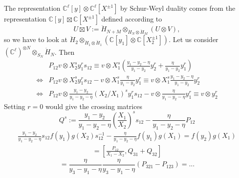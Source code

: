 \documentclass[11pt]{report}
\theoremstyle{definition}
\theoremstyle{remark}
\theoremstyle{remark}
\newcommand{\C}{\mathbb{C}}
\begin{document}
The representation $\C^\ell[y] \otimes \C^\ell[X^{\pm 1}]$ by Schur-Weyl duality comes from the representation $\C[y] \boxtimes \C[X^{\pm 1}]$ defined according to
\begin{equation*}
U \boxtimes V := \ddot{H}_{N+M} \otimes_{\ddot{H}_N \otimes \ddot{H}_M} (U \otimes V),
\end{equation*}
so we have to look at $\ddot{H}_2 \otimes_{\ddot{H}_1 \otimes \ddot{H}_1} (\C[y_1] \otimes \C[X_2^{\pm 1}])$. Let us consider $(\C^\ell)^{\otimes N} \otimes_{S_N} \ddot{H}_N$. Then
\begin{align*}
&P_{12} v \otimes X_2^s y_1^r s_{12}
\equiv v \otimes X_1^s \left( \frac{y_1-y_2-\eta}{y_1-y_2} y_2^r + \frac{\eta}{y_1-y_2} y_1^r \right) \\
\Leftrightarrow &P_{12} v \otimes X_2^s y_1^r s_{12} - v \otimes X_1^s \frac{\eta}{y_1-y_2} y_1^r \equiv v \otimes X_1^s \frac{y_1-y_2-\eta}{y_1-y_2} y_2^r \\
\Leftrightarrow &P_{12} v \otimes \frac{y_1-y_2}{y_1-y_2-\eta} (X_2/X_1)^s y_1^r s_{12} - v \otimes \frac{\eta}{y_1-y_2-\eta} y_1^r \equiv v \otimes y_2^r
\end{align*}
Setting $r=0$ would give the crossing matrices
\begin{equation*}
Q^s := \frac{y_1-y_2}{y_1-y_2-\eta} \left( \frac{X_1}{X_2} \right)^s s_{12} - \frac{\eta}{y_1-y_2-\eta} P_{12}
\end{equation*}
\begin{align*}
\frac{y_1-y_2}{y_1-y_2-\eta} s_{12} f(y_1) g(X_2) s_{12}^{-1} - \frac{\eta}{y_1-y_2-\eta} f(y_1) g(X_1) = f(y_2) g(X_1)
\end{align*}
\begin{align*}
[Q_{31},Q_{32}] = [\frac{P_{12}}{X_1-X_2},Q_{31}+Q_{32}]
\end{align*}
\begin{equation*}
[Q_{31},Q_{32}] = \frac{\eta}{y_3-y_1-\eta} \frac{\eta}{y_3-y_1-\eta} (P_{321}-P_{123}) = ...
\end{equation*}
\end{document}
